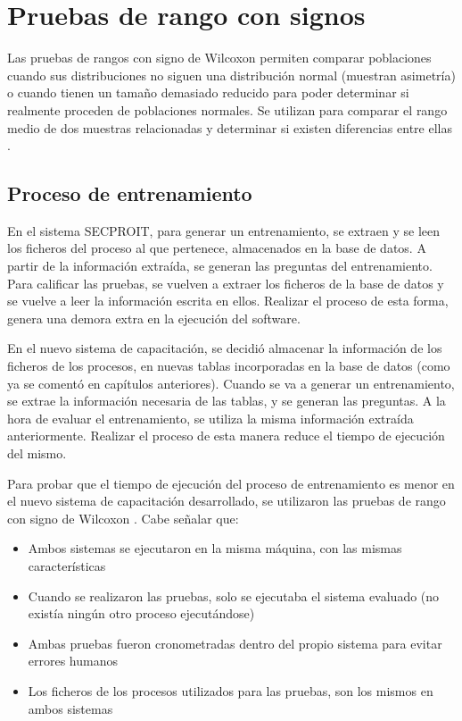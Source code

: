 \section{Pruebas de rango con signos}
Las pruebas de rangos con signo de Wilcoxon permiten comparar poblaciones cuando sus distribuciones no siguen una distribución normal (muestran asimetría) o cuando tienen un tamaño demasiado reducido para poder determinar si realmente proceden de poblaciones normales. Se utilizan para comparar el rango medio de dos muestras relacionadas y determinar si existen diferencias entre ellas \cite{Turcios2015}.

\subsection{Proceso de entrenamiento}
En el sistema SECPROIT, para generar un entrenamiento, se extraen y se leen los ficheros del proceso al que pertenece, almacenados en la base de datos. A partir de la información extraída, se generan las preguntas del entrenamiento. Para calificar las pruebas, se vuelven a extraer los ficheros de la base de datos y se vuelve a leer la información escrita en ellos. Realizar el proceso de esta forma, genera una demora extra en la ejecución del software.

En el nuevo sistema de capacitación, se decidió almacenar la información de los ficheros de los procesos, en nuevas tablas incorporadas en la base de datos (como ya se comentó en capítulos anteriores). Cuando se va a generar un entrenamiento, se extrae la información necesaria de las tablas, y se generan las preguntas. A la hora de evaluar el entrenamiento, se utiliza la misma información extraída anteriormente. Realizar el proceso de esta manera reduce el tiempo de ejecución del mismo.

Para probar que el tiempo de ejecución del proceso de entrenamiento es menor en el nuevo sistema de capacitación desarrollado, se utilizaron las pruebas de rango con signo de Wilcoxon \cite{Turcios2015}. Cabe señalar que:

\begin{itemize}
\item Ambos sistemas se ejecutaron en la misma máquina, con las mismas características
\item Cuando se realizaron las pruebas, solo se ejecutaba el sistema evaluado (no existía ningún otro proceso ejecutándose)
\item Ambas pruebas fueron cronometradas dentro del propio sistema para evitar errores humanos
\item Los ficheros de los procesos utilizados para las pruebas, son los mismos en ambos sistemas
\end{itemize}

